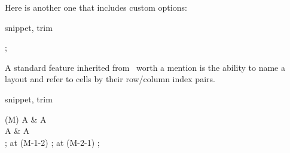 Here is another one that includes custom options:

\begin{tcblisting}{snippet, trim}
\begin{kodi}[square=3em]
;
\end{kodi}
\end{tcblisting}

A standard feature inherited from \TikZ\ worth a mention
is the ability to name a layout and refer to cells
by their row/column index pairs.

\begin{tcblisting}{snippet, trim}
\begin{kodi}[square=3em]
\obj (M) { A & A \\ A & A \\ };
\node [draw=red,  shape=circle, minimum size=2em] at (M-1-2) {};
\node [draw=blue, shape=circle, minimum size=2em] at (M-2-1) {};
\end{kodi}
\end{tcblisting}
